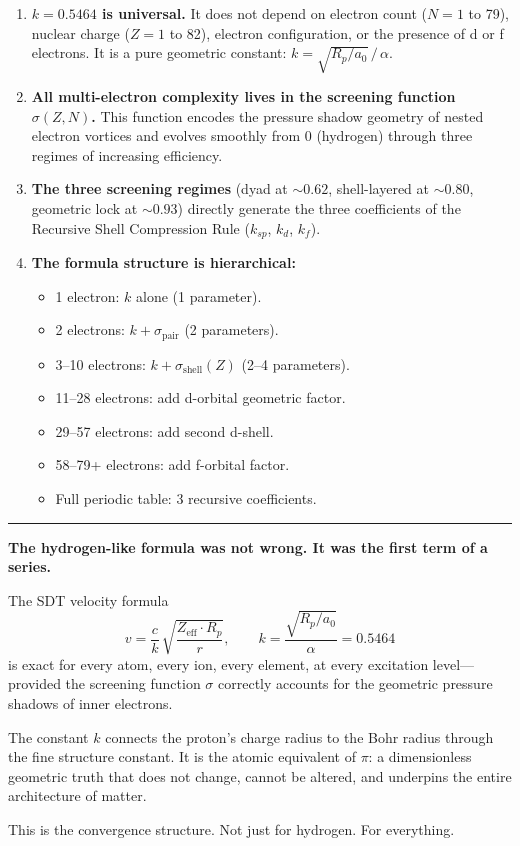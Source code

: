 \begin{enumerate}
  \item \textbf{$k = 0.5464$ is universal.}  It does not depend on electron count ($N = 1$ to 79), nuclear charge ($Z = 1$ to 82), electron configuration, or the presence of d or f electrons.  It is a pure geometric constant: $k = \sqrt{R_p/a_0}\,/\,\alpha$.

  \item \textbf{All multi-electron complexity lives in the screening function $\sigma(Z, N)$.}  This function encodes the pressure shadow geometry of nested electron vortices and evolves smoothly from 0 (hydrogen) through three regimes of increasing efficiency.

  \item \textbf{The three screening regimes} (dyad at $\sim 0.62$, shell-layered at $\sim 0.80$, geometric lock at $\sim 0.93$) directly generate the three coefficients of the Recursive Shell Compression Rule ($k_{sp}$, $k_d$, $k_f$).

  \item \textbf{The formula structure is hierarchical:}
    \begin{itemize}
      \item 1 electron: $k$ alone (1 parameter).
      \item 2 electrons: $k + \sigma_{\text{pair}}$ (2 parameters).
      \item 3--10 electrons: $k + \sigma_{\text{shell}}(Z)$ (2--4 parameters).
      \item 11--28 electrons: add d-orbital geometric factor.
      \item 29--57 electrons: add second d-shell.
      \item 58--79+ electrons: add f-orbital factor.
      \item Full periodic table: 3 recursive coefficients.
    \end{itemize}
\end{enumerate}

\noindent\rule{\textwidth}{0.4pt}

\textbf{The hydrogen-like formula was not wrong.  It was the first term of a series.}

The SDT velocity formula
\begin{equation}
  v = \frac{c}{k}\,\sqrt{\frac{Z_{\text{eff}} \cdot R_p}{r}}, \qquad k = \frac{\sqrt{R_p/a_0}}{\alpha} = 0.5464
\end{equation}
is exact for every atom, every ion, every element, at every excitation level---provided the screening function $\sigma$ correctly accounts for the geometric pressure shadows of inner electrons.

The constant $k$ connects the proton's charge radius to the Bohr radius through the fine structure constant.  It is the atomic equivalent of $\pi$: a dimensionless geometric truth that does not change, cannot be altered, and underpins the entire architecture of matter.

This is the convergence structure.  Not just for hydrogen.  For everything.
